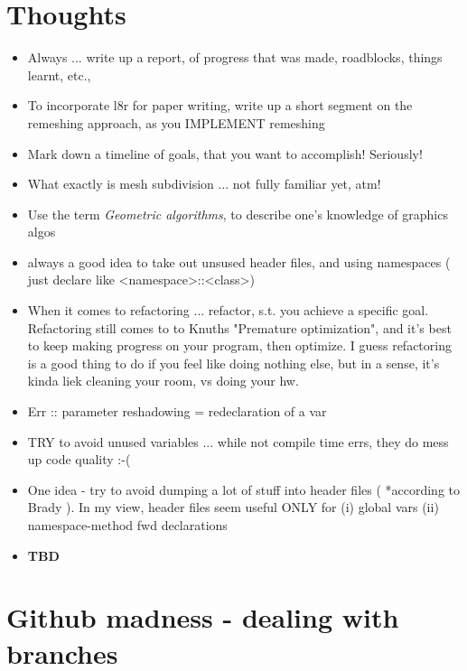 \documentclass{article}
\begin{document}
\section{Thoughts}
\begin{itemize}
	\item Always ... write up a report, of progress that was made, roadblocks, things learnt, etc., 
	\item To incorporate l8r for paper writing, write up a short segment on the remeshing approach, as you IMPLEMENT remeshing
	\item Mark down a timeline of goals, that you want to accomplish! Seriously!
	\item What exactly is mesh subdivision ... not fully familiar yet, atm!
	\item Use the term \textit{Geometric algorithms}, to describe one's knowledge of graphics algos
	\item always a good idea to take out unsused header files, and using namespaces ( just declare like <namespace>::<class>)
	\item When it comes to refactoring ... refactor, s.t. you achieve a specific goal. Refactoring still comes to to Knuths "Premature optimization", and it's best to keep making progress on your program, then optimize. I guess refactoring is a good thing to do if you feel like doing nothing else, but in a sense, it's kinda liek cleaning your room, vs doing your hw.
	\item Err :: parameter reshadowing = redeclaration of a var
	\item TRY to avoid unused variables ... while not compile time errs, they do mess up code quality :-(
	\item One idea - try to avoid dumping a lot of stuff into header files ( *according to Brady ). In my view, header files seem useful ONLY for (i) global vars (ii) namespace-method fwd declarations
	\item \textbf{TBD} 
\end{itemize}

\section{Github madness - dealing with branches}
\end{document}
